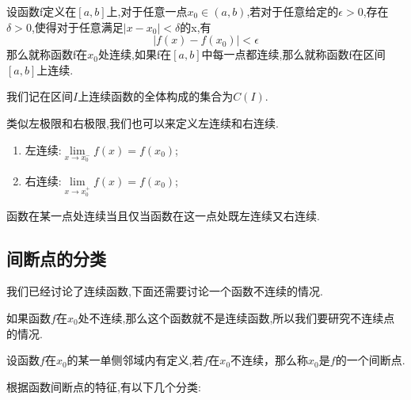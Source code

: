 \begin{definition}
	设函数f定义在$\left[a,b\right]$上,对于任意一点$x_{0}\in \left(a,b\right)$,若对于任意给定的$\epsilon>0$,存在$\delta>0$,使得对于任意满足$\left|x-x_0\right|<\delta$的x,有
	\[
		\left|f(x)-f(x_0)\right|<\epsilon
	\]
	那么就称函数f在$x_0$处连续,如果f在$\left[a,b\right]$中每一点都连续,那么就称函数f在区间$\left[a,b\right]$上连续.
\end{definition}

我们记在区间$I$上连续函数的全体构成的集合为$C(I)$.

类似左极限和右极限,我们也可以来定义左连续和右连续.
\begin{enumerate}
	\item 左连续:$\lim\limits_{x\to x_{0}^{-}}f(x)=f(x_0)$;
	\item 右连续:$\lim\limits_{x\to x_{0}^{+}}f(x)=f(x_0)$;
\end{enumerate}

\begin{theorem}
	函数在某一点处连续当且仅当函数在这一点处既左连续又右连续.
\end{theorem}

\subsection{间断点的分类}
我们已经讨论了连续函数,下面还需要讨论一个函数不连续的情况.

如果函数$f$在$x_0$处不连续,那么这个函数就不是连续函数,所以我们要研究不连续点的情况.

\begin{definition}
	设函数$f$在$x_0$的某一单侧邻域内有定义,若$f$在$x_0$不连续，那么称$x_0$是$f$的一个间断点.
\end{definition}
根据函数间断点的特征,有以下几个分类:

